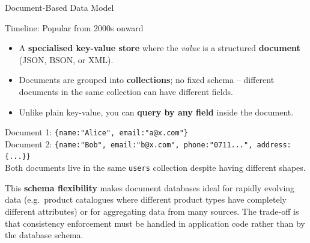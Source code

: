 \begin{frame}{Document-Based Data Model}
  \begin{block}{Timeline: Popular from 2000s onward}
    \begin{itemize}
      \item A \textbf{specialised key-value store} where the \emph{value} is a
            structured \textbf{document} (JSON, BSON, or XML).
      \item Documents are grouped into \textbf{collections}; no fixed schema
            -- different documents in the same collection can have different fields.
      \item Unlike plain key-value, you can \textbf{query by any field}
            inside the document.
    \end{itemize}
  \end{block}

  \begin{examples}{}
    Document 1: \texttt{\{name:"Alice", email:"a@x.com"\}}\\
    Document 2: \texttt{\{name:"Bob", email:"b@x.com", phone:"0711...", address:\{...\}\}}\\[4pt]
    Both documents live in the same \texttt{users} collection despite
    having different shapes.
  \end{examples}

  This \textbf{schema flexibility} makes document databases ideal for
  rapidly evolving data (e.g.\ product catalogues where different product
  types have completely different attributes) or for aggregating data from
  many sources.  The trade-off is that consistency enforcement must be
  handled in application code rather than by the database schema.
\end{frame}

